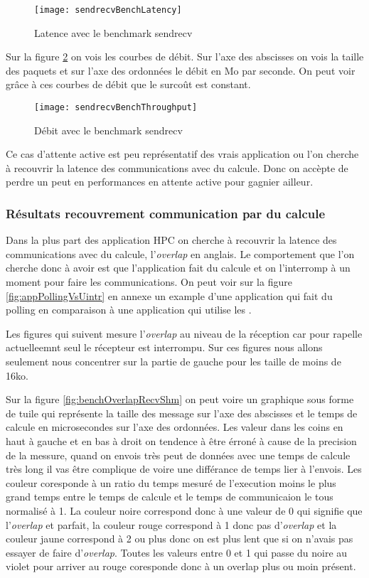 \begin{figure}[H]
  \texttt{[image: sendrecvBenchLatency]}
  \caption{Latence avec le benchmark sendrecv}
  \label{fig:sendrecvBenchLatency}
\end{figure}

Sur la figure \ref{fig:sendrecvBenchThroughput} on vois les courbes de débit.
Sur l'axe des abscisses on vois la taille des paquets et sur l'axe des ordonnées le débit en Mo par seconde.
On peut voir grâce à ces courbes de débit que le surcoût est constant.

\begin{figure}[H]
  \texttt{[image: sendrecvBenchThroughput]}
  \caption{Débit avec le benchmark sendrecv}
  \label{fig:sendrecvBenchThroughput}
\end{figure}

Ce cas d'attente active est peu représentatif des vrais application ou l'on cherche à recouvrir la latence des communications avec du calcule.
Donc on accèpte de perdre un peut en performances en attente active pour gagnier ailleur.

\subsubsection{Résultats recouvrement communication par du calcule}

Dans la plus part des application HPC on cherche à recouvrir la latence des communications avec du calcule, l'\emph{overlap} en anglais.
Le comportement que l'on cherche donc à avoir est que l'application fait du calcule et on l'interromp à un moment pour faire les communications.
On peut voir sur la figure \ref{fig:appPollingVsUintr} en annexe un example d'une application qui fait du polling en comparaison à une application qui utilise les \uintr{}.

Les figures qui suivent mesure l'\emph{overlap} au niveau de la réception car pour rapelle actuelleemnt seul le récepteur est interrompu.
Sur ces figures nous allons seulement nous concentrer sur la partie de gauche pour les taille de moins de 16ko.

Sur la figure \ref{fig:benchOverlapRecvShm} on peut voire un graphique sous forme de tuile qui représente la taille des message sur l'axe des abscisses
et le temps de calcule en microsecondes sur l'axe des ordonnées.
Les valeur dans les coins en haut à gauche et en bas à droit on tendence à être érroné à cause de la precision de la messure,
quand on envois très peut de données avec une temps de calcule très long il vas être complique de voire une différance de temps lier à l'envois.
Les couleur coresponde à un ratio du temps mesuré de l'execution moins le plus grand temps entre le temps de calcule et le temps de communicaion le tous normalisé à 1.
La couleur noire correspond donc à une valeur de 0 qui signifie que l'\emph{overlap} et parfait,
la couleur rouge correspond à 1 donc pas d'\emph{overlap} et
la couleur jaune correspond à 2 ou plus donc on est plus lent que si on n'avais pas essayer de faire d'\emph{overlap}.
Toutes les valeurs entre 0 et 1 qui passe du noire au violet pour arriver au rouge coresponde donc à un overlap plus ou moin présent.


